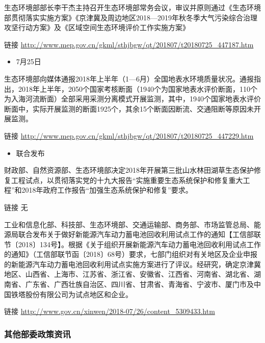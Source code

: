 \documentclass[
]{book}
\providecommand{\tightlist}{%
  \setlength{\itemsep}{0pt}\setlength{\parskip}{0pt}}
\begin{document}
生态环境部部长李干杰主持召开生态环境部常务会议，审议并原则通过《生态环境部贯彻落实实施方案》《京津冀及周边地区2018---2019年秋冬季大气污染综合治理攻坚行动方案》及《区域空间生态环境评价工作实施方案》

链接 \url{http://www.mep.gov.cn/gkml/sthjbgw/qt/201807/t20180725_447187.htm}

\begin{itemize}
\tightlist
\item
  7月25日
\end{itemize}

生态环境部向媒体通报2018年上半年（1---6月）全国地表水环境质量状况。通报指出，2018年上半年，2050个国家考核断面（1940个为国家地表水评价断面，110个为入海河流断面）全部采用采测分离模式开展监测，其中，1940个国家地表水评价断面中，实际开展监测的断面1925个，其余15个断面因断流、交通阻断等原因未开展监测。

链接 \url{http://www.mep.gov.cn/gkml/sthjbgw/qt/201807/t20180725_447229.htm}

\begin{itemize}
\tightlist
\item
  联合发布
\end{itemize}

财政部、自然资源部、生态环境部决定2018年开展第三批山水林田湖草生态保护修复工程试点，以贯彻落实党的十九大报告``实施重要生态系统保护和修复重大工程''和2018年政府工作报告``加强生态系统保护和修复''要求。

链接 无

工业和信息化部、科技部、生态环境部、交通运输部、商务部、市场监管总局、能源局联合发布关于做好新能源汽车动力蓄电池回收利用试点工作的通知【工信部联节〔2018〕134号】。根据《关于组织开展新能源汽车动力蓄电池回收利用试点工作的通知》（工信部联节函〔2018〕68号）要求，七部门组织对有关地区及企业申报的新能源汽车动力蓄电池回收利用试点实施方案进行了评议。经研究，确定京津冀地区、山西省、上海市、江苏省、浙江省、安徽省、江西省、河南省、湖北省、湖南省、广东省、广西壮族自治区、四川省、甘肃省、青海省、宁波市、厦门市及中国铁塔股份有限公司为试点地区和企业。

链接 \url{http://www.gov.cn/xinwen/2018-07/26/content_5309433.htm}

\hypertarget{ux5176ux4ed6ux90e8ux59d4ux653fux7b56ux8d44ux8baf-3}{%
\subsubsection*{其他部委政策资讯}\label{ux5176ux4ed6ux90e8ux59d4ux653fux7b56ux8d44ux8baf-3}}
\end{document}
